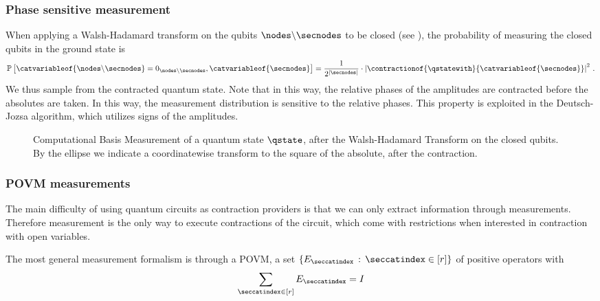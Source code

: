 \subsubsection{Phase sensitive measurement}

When applying a Walsh-Hadamard transform on the qubits $\nodes\backslash\secnodes$ to be closed (see ), the probability of measuring the closed qubits in the ground state is %
\begin{align*}
    \probat{\catvariableof{\nodes\backslash\secnodes}=0_{\nodes\backslash\secnodes},\catvariableof{\secnodes}}
    = \frac{1}{2^{\cardof{\secnodes}}} \cdot \absof{\contractionof{\qstatewith}{\catvariableof{\secnodes}}}^2 \, .
\end{align*}
We thus sample from the contracted quantum state.
Note that in this way, the relative phases of the amplitudes are contracted before the absolutes are taken.
In this way, the measurement distribution is sensitive to the relative phases.
This property is exploited in the Deutsch-Jozsa algorithm, which utilizes signs of the amplitudes.

\begin{figure}
    \begin{center}
        
    \end{center}
    \caption{Computational Basis Measurement of a quantum state $\qstate$, after the Walsh-Hadamard Transform on the closed qubits.
    By the ellipse we indicate a coordinatewise transform to the square of the absolute, after the contraction.}
    \label{fig:phaseContractionMeasurement}
\end{figure}

\subsubsection{POVM measurements}

The main difficulty of using quantum circuits as contraction providers is that we can only extract information through measurements.
Therefore measurement is the only way to execute contractions of the circuit, which come with restrictions when interested in contraction with open variables.

The most general measurement formalism is through a POVM, a set $\{E_\seccatindex \, : \, \seccatindex\in[r]\}$ of positive operators with %
\begin{align*}
    \sum_{\seccatindex\in[r]} E_\seccatindex = I
\end{align*}

